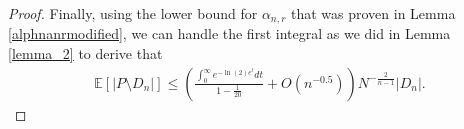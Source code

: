 \documentclass[10pt, twoside, leqno]{article}
\newtheorem{thm}{Theorem}[section]
\newtheorem{lemma}[thm]{Lemma}
\theoremstyle{definition}
\numberwithin{equation}{section}
\newcommand{\E}{{\mathbb{E}}}
\newcommand{\R}{\mathbb{R}}
\newcommand{\NN}{N^{-\frac 2{n-1} }}
\begin{document}
\begin{proof}
	Finally,  using the lower bound for $ \alpha_{n,r}$ that was proven in Lemma \ref{alphnanrmodified}, we can handle the first integral as we did in Lemma \ref{lemma_2} to derive that
	\begin{align*}
	\E[|P \setminus D_n|]  \leq \left(\frac{\int_{0}^{\infty}e^{-\ln(2)e^{t}}dt}{1-\frac{1}{20}}+O\left(n^{-0.5}\right)\right)N^{-\frac{2}{n-1}}|D_n|.
	\end{align*}
\end{proof}
\end{document}
